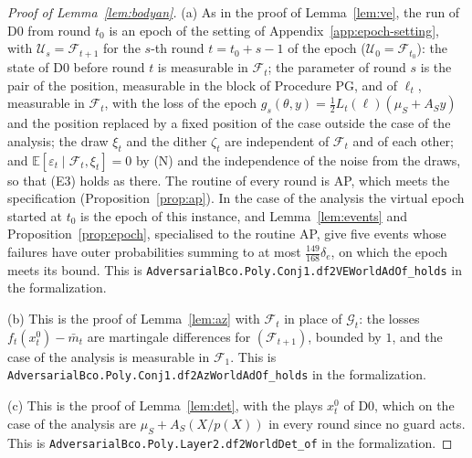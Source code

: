 \documentclass[11pt]{amsart}
\theoremstyle{definition}
\numberwithin{equation}{section}
\newcommand{\E}{\mathbb{E}}
\newcommand{\cG}{\mathscr{G}}
\newcommand{\cF}{\mathscr{F}}
\begin{document}
\begin{proof}[Proof of Lemma~\ref{lem:bodyan}]
(a) As in the proof of Lemma~\ref{lem:ve}, the run of D0 from round $t_0$ is an epoch of the setting of Appendix~\ref{app:epoch-setting}, with $\mathcal U_s=\cF_{t+1}$ for the $s$-th round $t=t_0+s-1$ of the epoch ($\mathcal U_0=\cF_{t_0}$): the state of D0 before round $t$ is measurable in $\cF_t$; the parameter of round $s$ is the pair of the position, measurable in the block of Procedure PG, and of $\ell_t$, measurable in $\cF_t$, with the loss of the epoch $g_s(\theta,y)=\frac12L_t(\ell)(\mu_S+A_Sy)$ and the position replaced by a fixed position of the case outside the case of the analysis; the draw $\xi_t$ and the dither $\zeta_t$ are independent of $\cF_t$ and of each other; and $\E[\varepsilon_t\mid\cF_t,\xi_t]=0$ by (N) and the independence of the noise from the draws, so that (E3) holds as there. The routine of every round is AP, which meets the specification (Proposition~\ref{prop:ap}). In the case of the analysis the virtual epoch started at $t_0$ is the epoch of this instance, and Lemma~\ref{lem:events} and Proposition~\ref{prop:epoch}, specialised to the routine AP, give five events whose failures have outer probabilities summing to at most $\frac{149}{168}\delta_e$, on which the epoch meets its bound.
This is \texttt{AdversarialBco.Poly.Conj1.df2VEWorldAdOf\_holds} in the formalization.

(b) This is the proof of Lemma~\ref{lem:az} with $\cF_t$ in place of $\cG_t$: the losses $f_t(x^0_t)-\bar m_t$ are martingale differences for $(\cF_{t+1})$, bounded by $1$, and the case of the analysis is measurable in $\cF_1$.
This is \texttt{AdversarialBco.Poly.Conj1.df2AzWorldAdOf\_holds} in the formalization.

(c) This is the proof of Lemma~\ref{lem:det}, with the plays $x^0_t$ of D0, which on the case of the analysis are $\mu_S+A_S(X/p(X))$ in every round since no guard acts.
This is \texttt{AdversarialBco.Poly.Layer2.\allowbreak df2WorldDet\_of} in the formalization.
\end{proof}
\end{document}
